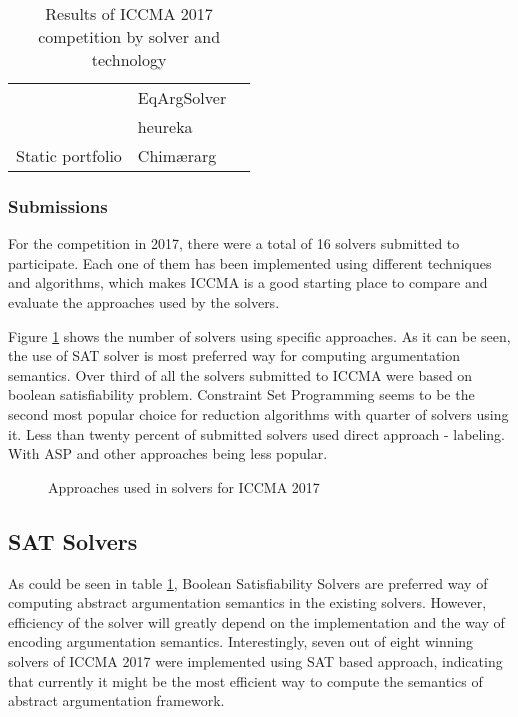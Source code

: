 \begin{table}[]
\begin{tabular}{lll}
		\multicolumn{1}{l|}{}                                         & EqArgSolver                 &                         \\ \cline{2-3} 
		\multicolumn{1}{l|}{}                                         & heureka                     &                         \\ \hline
		\multicolumn{1}{l|}{Static portfolio}                        & Chim\ae rarg &                         \\ \hline
	\end{tabular}
	\caption{Results of ICCMA 2017 competition by solver and technology}
	\label{table:iccmaResultsbySolver}
\end{table}

\subsubsection{Submissions}
For the competition in 2017, there were a total of 16 solvers submitted to participate. Each one of them has been implemented using different techniques and algorithms, which makes ICCMA is a good starting place to compare and evaluate the approaches used by the solvers.

Figure \ref{fig:approachesBarChart} shows the number of solvers using specific approaches. As it can be seen, the use of SAT solver is most preferred way for computing argumentation semantics. Over third of all the solvers submitted to ICCMA were based on boolean satisfiability problem. Constraint Set Programming seems to be the second most popular choice for reduction algorithms with quarter of solvers using it. Less than twenty percent of submitted solvers used direct approach - labeling. With ASP and other approaches being less popular.

\begin{figure}
	\centering
	\caption{Approaches used in solvers for ICCMA 2017}
	\label{fig:approachesBarChart}
\end{figure}

\subsection{SAT Solvers}
As could be seen in table \ref{table:iccmaResultsbySolver}, Boolean Satisfiability Solvers are preferred way of computing abstract argumentation semantics in the existing solvers. However, efficiency of the solver will greatly depend on the implementation and the way of encoding argumentation semantics. Interestingly, seven out of eight winning solvers of ICCMA 2017 were implemented using SAT based approach, indicating that currently it might be the most efficient way to compute the semantics of abstract argumentation framework.

